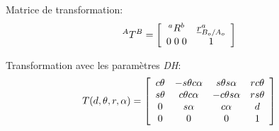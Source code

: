 Matrice de transformation:
\begin{align}
{}^AT^B &=
\left[ \begin{array}{c c }
		   ^aR^b & \underline{r}_{B_o/A_o}^a \\ 0 \; 0 \; 0 & 1
\end{array} \right]
\end{align}


Transformation avec les paramètres \textit{DH}:
\begin{align}
	T(d,\theta,r,\alpha) &=
	\left[ \begin{array}{c c c c }
			   c\theta & -s\theta c\alpha & s\theta s\alpha & r c\theta\\
			   s\theta & c\theta c\alpha  & -c\theta s\alpha  & r s\theta\\
			   0 & s\alpha & c\alpha  &  d\\
			   0 & 0 & 0 & 1
	\end{array}  \right]
	\label{eq:Tdh}
\end{align}

